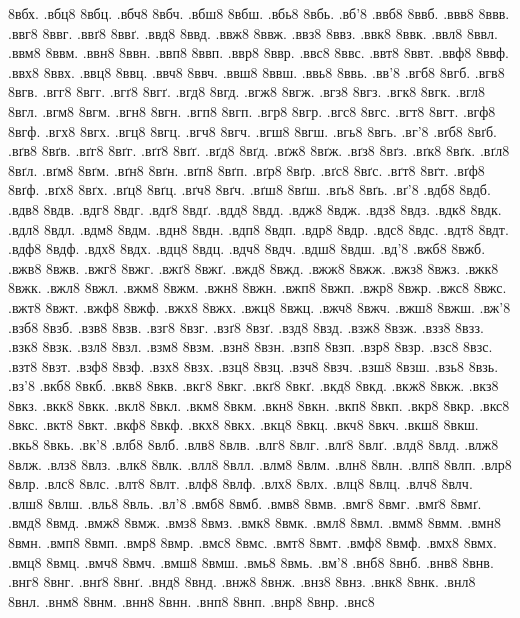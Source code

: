 {8вбх.
.вбц8
8вбц.
.вбч8
8вбч.
.вбш8
8вбш.
.вбь8
8вбь.
.вб'8
.ввб8
8ввб.
.ввв8
8ввв.
.ввг8
8ввг.
.ввґ8
8ввґ.
.ввд8
8ввд.
.ввж8
8ввж.
.ввз8
8ввз.
.ввк8
8ввк.
.ввл8
8ввл.
.ввм8
8ввм.
.ввн8
8ввн.
.ввп8
8ввп.
.ввр8
8ввр.
.ввс8
8ввс.
.ввт8
8ввт.
.ввф8
8ввф.
.ввх8
8ввх.
.ввц8
8ввц.
.ввч8
8ввч.
.ввш8
8ввш.
.ввь8
8ввь.
.вв'8
.вгб8
8вгб.
.вгв8
8вгв.
.вгг8
8вгг.
.вгґ8
8вгґ.
.вгд8
8вгд.
.вгж8
8вгж.
.вгз8
8вгз.
.вгк8
8вгк.
.вгл8
8вгл.
.вгм8
8вгм.
.вгн8
8вгн.
.вгп8
8вгп.
.вгр8
8вгр.
.вгс8
8вгс.
.вгт8
8вгт.
.вгф8
8вгф.
.вгх8
8вгх.
.вгц8
8вгц.
.вгч8
8вгч.
.вгш8
8вгш.
.вгь8
8вгь.
.вг'8
.вґб8
8вґб.
.вґв8
8вґв.
.вґг8
8вґг.
.вґґ8
8вґґ.
.вґд8
8вґд.
.вґж8
8вґж.
.вґз8
8вґз.
.вґк8
8вґк.
.вґл8
8вґл.
.вґм8
8вґм.
.вґн8
8вґн.
.вґп8
8вґп.
.вґр8
8вґр.
.вґс8
8вґс.
.вґт8
8вґт.
.вґф8
8вґф.
.вґх8
8вґх.
.вґц8
8вґц.
.вґч8
8вґч.
.вґш8
8вґш.
.вґь8
8вґь.
.вґ'8
.вдб8
8вдб.
.вдв8
8вдв.
.вдг8
8вдг.
.вдґ8
8вдґ.
.вдд8
8вдд.
.вдж8
8вдж.
.вдз8
8вдз.
.вдк8
8вдк.
.вдл8
8вдл.
.вдм8
8вдм.
.вдн8
8вдн.
.вдп8
8вдп.
.вдр8
8вдр.
.вдс8
8вдс.
.вдт8
8вдт.
.вдф8
8вдф.
.вдх8
8вдх.
.вдц8
8вдц.
.вдч8
8вдч.
.вдш8
8вдш.
.вд'8
.вжб8
8вжб.
.вжв8
8вжв.
.вжг8
8вжг.
.вжґ8
8вжґ.
.вжд8
8вжд.
.вжж8
8вжж.
.вжз8
8вжз.
.вжк8
8вжк.
.вжл8
8вжл.
.вжм8
8вжм.
.вжн8
8вжн.
.вжп8
8вжп.
.вжр8
8вжр.
.вжс8
8вжс.
.вжт8
8вжт.
.вжф8
8вжф.
.вжх8
8вжх.
.вжц8
8вжц.
.вжч8
8вжч.
.вжш8
8вжш.
.вж'8
.взб8
8взб.
.взв8
8взв.
.взг8
8взг.
.взґ8
8взґ.
.взд8
8взд.
.взж8
8взж.
.взз8
8взз.
.взк8
8взк.
.взл8
8взл.
.взм8
8взм.
.взн8
8взн.
.взп8
8взп.
.взр8
8взр.
.взс8
8взс.
.взт8
8взт.
.взф8
8взф.
.взх8
8взх.
.взц8
8взц.
.взч8
8взч.
.взш8
8взш.
.взь8
8взь.
.вз'8
.вкб8
8вкб.
.вкв8
8вкв.
.вкг8
8вкг.
.вкґ8
8вкґ.
.вкд8
8вкд.
.вкж8
8вкж.
.вкз8
8вкз.
.вкк8
8вкк.
.вкл8
8вкл.
.вкм8
8вкм.
.вкн8
8вкн.
.вкп8
8вкп.
.вкр8
8вкр.
.вкс8
8вкс.
.вкт8
8вкт.
.вкф8
8вкф.
.вкх8
8вкх.
.вкц8
8вкц.
.вкч8
8вкч.
.вкш8
8вкш.
.вкь8
8вкь.
.вк'8
.влб8
8влб.
.влв8
8влв.
.влг8
8влг.
.влґ8
8влґ.
.влд8
8влд.
.влж8
8влж.
.влз8
8влз.
.влк8
8влк.
.влл8
8влл.
.влм8
8влм.
.влн8
8влн.
.влп8
8влп.
.влр8
8влр.
.влс8
8влс.
.влт8
8влт.
.влф8
8влф.
.влх8
8влх.
.влц8
8влц.
.влч8
8влч.
.влш8
8влш.
.вль8
8вль.
.вл'8
.вмб8
8вмб.
.вмв8
8вмв.
.вмг8
8вмг.
.вмґ8
8вмґ.
.вмд8
8вмд.
.вмж8
8вмж.
.вмз8
8вмз.
.вмк8
8вмк.
.вмл8
8вмл.
.вмм8
8вмм.
.вмн8
8вмн.
.вмп8
8вмп.
.вмр8
8вмр.
.вмс8
8вмс.
.вмт8
8вмт.
.вмф8
8вмф.
.вмх8
8вмх.
.вмц8
8вмц.
.вмч8
8вмч.
.вмш8
8вмш.
.вмь8
8вмь.
.вм'8
.внб8
8внб.
.внв8
8внв.
.внг8
8внг.
.внґ8
8внґ.
.внд8
8внд.
.внж8
8внж.
.внз8
8внз.
.внк8
8внк.
.внл8
8внл.
.внм8
8внм.
.внн8
8внн.
.внп8
8внп.
.внр8
8внр.
.внс8
}

